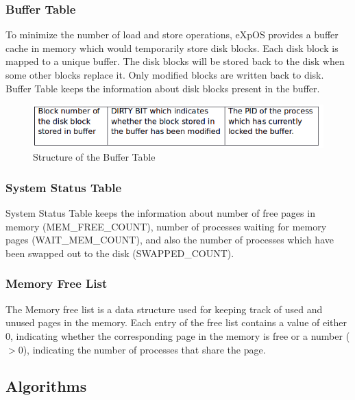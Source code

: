 \documentclass[11pt ,twosided]{article}
\begin{document}
\subsubsection{Buffer Table}

To minimize the number of load and store operations, eXpOS provides a buffer cache in memory which would temporarily store disk blocks. Each disk block is mapped to a unique buffer. The disk blocks will be stored back to the disk when some other blocks replace it. Only modified blocks are written back to disk.
Buffer Table keeps the information about disk blocks present in the buffer.
\begin{figure}[ht]
\centering
\includegraphics[scale=0.60]{Buffer_table.png}
\caption{\footnotesize Structure of the Buffer Table}
\label{fig_8}
\end{figure}
\subsubsection{System Status Table}

System Status Table keeps the information about number of free pages in memory (MEM\_FREE\_COUNT), number of processes waiting for memory pages (WAIT\_MEM\_COUNT), and also the number of processes which have been swapped out to the disk (SWAPPED\_COUNT).
\subsubsection{Memory Free List}

The Memory free list is a data structure used for keeping track of used and unused pages in the memory. Each entry of the free list contains a value of either 0, indicating whether the corresponding page in the memory is free or a number ($>$0), indicating the number of processes that share the page.
\subsection{Algorithms}
\end{document}
